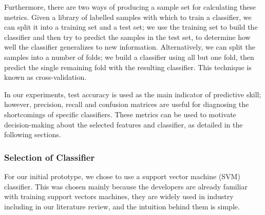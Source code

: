 \documentclass[12pt]{article}
\begin{document}
Furthermore, there are two ways of producing a sample set for calculating these metrics. Given a library of labelled samples with which to train a classifier, we can split it into a training set and a test set; we use the training set to build the classifier and then try to predict the samples in the test set, to determine how well the classifier generalizes to new information. Alternatively, we can split the samples into a number of folds; we build a classifier using all but one fold, then predict the single remaining fold with the resulting classifier. This technique is known as cross-validation.  

In our experiments, test accuracy is used as the main indicator of predictive skill; however, precision, recall and confusion matrices are useful for diagnosing the shortcomings of specific classifiers. These metrics can be used to motivate decision-making about the selected features and classifier, as detailed in the following sections. 

\subsubsection{Selection of Classifier}
For our initial prototype, we chose to use a support vector machine (SVM) classifier. This was chosen mainly because the developers are already familiar with training support vectors machines, they are widely used in industry including in our literature review, and the intuition behind them is simple. 
\end{document}
